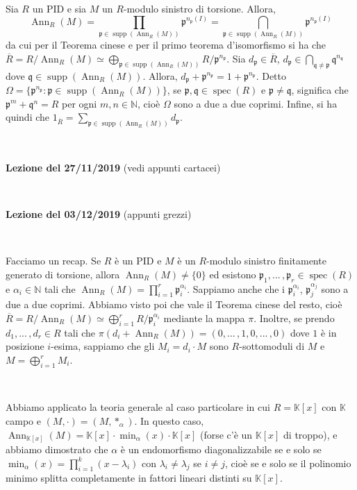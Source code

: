 \documentclass{article}
\theoremstyle{definition}
\newcommand{\Ann}{\operatorname{Ann}}
\newcommand{\spec}{\operatorname{spec}}
\begin{document}
\

\noindent Sia $R$ un PID e sia $M$ un $R$-modulo sinistro di torsione. Allora, \[\operatorname{Ann}_R(M)=\prod\limits_{\mathfrak{p}\in \operatorname{supp}(\Ann_R(M))} \mathfrak{p}^{n_{\mathfrak{p}}(I)}=\bigcap\limits_{\mathfrak{p}\in \operatorname{supp}(\Ann_R(M))} \mathfrak{p}^{n_{\mathfrak{p}}(I)}\] da cui per il Teorema cinese e per il primo teorema d'isomorfismo si ha che $\overline{R}=R/\Ann_R(M)\simeq \bigoplus\limits_{\mathfrak{p}\in \operatorname{supp}(\Ann_R(M))} R/\mathfrak{p}^{n_{\mathfrak{p}}}$. Sia $d_{\mathfrak{p}}\in \overline{R}$, $d_{\mathfrak{p}}\in \bigcap\limits_{\mathfrak{q}\neq \mathfrak{p}} \mathfrak{q}^{n_{\mathfrak{q}}}$ dove $\mathfrak{q}\in \operatorname{supp}(\Ann_R(M))$. Allora, $d_{\mathfrak{p}}+\mathfrak{p}^{n_{\mathfrak{p}}} = 1+\mathfrak{p}^{n_{\mathfrak{p}}}$. Detto $\Omega=\{ \mathfrak{p}^{n_{\mathfrak{p}}}: \mathfrak{p}\in \operatorname{supp}(\Ann_R(M))\}$, se $\mathfrak{p},\mathfrak{q}\in \spec(R)$ e $\mathfrak{p}\neq \mathfrak{q}$, significa che $\mathfrak{p}^m+\mathfrak{q}^n=R$ per ogni $m,n\in \mathbb{N}$, cioè $\Omega$ sono a due a due coprimi. Infine, si ha quindi che $1_{\overline{R}}=\sum\limits_{\mathfrak{p}\in \operatorname{supp}(\Ann_R(M))} d_{\mathfrak{p}}$.

\
 
\noindent \textbf{Lezione del 27/11/2019} (vedi appunti cartacei)

\

\noindent \textbf{Lezione del 03/12/2019} (appunti grezzi)

\

\noindent Facciamo un recap. Se $R$ è un PID e $M$ è un $R$-modulo sinistro finitamente generato di torsione, allora $\Ann_R(M)\neq \{0\}$ ed esistono $\mathfrak{p}_1,...\,,\mathfrak{p}_r\in \spec(R)$ e $\alpha_i\in \mathbb{N}$ tali che $\Ann_R(M)=\prod\limits_{i=1}^r \mathfrak{p}_i^{\alpha_i}$. Sappiamo anche che i $\mathfrak{p}_i^{\alpha_i}$, $\mathfrak{p}_j^{\alpha_j}$ sono a due a due coprimi. Abbiamo visto poi che vale il Teorema cinese del resto, cioè $\overline{R}=R/\Ann_R(M)\simeq \bigoplus\limits_{i=1}^r R/\mathfrak{p}_i^{\alpha_i}$ mediante la mappa $\pi$. Inoltre, se prendo $d_1,...\,,d_r\in R$ tali che $\pi(d_i+\Ann_R(M))=(0,...\,,1,0,...\,,0)$ dove $1$ è in posizione $i$-esima, sappiamo che gli $M_i=d_i\cdot M$ sono $R$-sottomoduli di $M$ e $M=\bigoplus\limits_{i=1}^r M_i$.

\

\noindent Abbiamo applicato la teoria generale al caso particolare in cui $R=\mathbb{K}[x]$ con $\mathbb{K}$ campo e $(M,\cdot)=(M,\ast_{\alpha})$. In questo caso, $\Ann_{\mathbb{K}[x]}(M)=\mathbb{K}[x]\cdot \min_{\alpha}(x)\cdot \mathbb{K}[x]$ (forse c'è un $\mathbb{K}[x]$ di troppo), e abbiamo dimostrato che $\alpha$ è un endomorfismo diagonalizzabile se e solo se $\min_{\alpha}(x)=\prod\limits_{i=1}^k (x-\lambda_i)$ con $\lambda_i\neq \lambda_j$ se $i\neq j$, cioè se e solo se il polinomio minimo splitta completamente in fattori lineari distinti su $\mathbb{K}[x]$.
\end{document}
